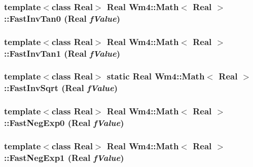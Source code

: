 \subsubsection{\setlength{\rightskip}{0pt plus 5cm}template$<$class Real$>$ Real {\bf Wm4::Math}$<$ Real $>$::Fast\-Inv\-Tan0 (Real {\em f\-Value})\hspace{0.3cm}{\tt  [static]}}\label{classWm4_1_1Math_f71b8efef9741a01ead8958f15030396}


\subsubsection{\setlength{\rightskip}{0pt plus 5cm}template$<$class Real$>$ Real {\bf Wm4::Math}$<$ Real $>$::Fast\-Inv\-Tan1 (Real {\em f\-Value})\hspace{0.3cm}{\tt  [static]}}\label{classWm4_1_1Math_6a4efcdad00d630ff4397e77dab1e74a}


\subsubsection{\setlength{\rightskip}{0pt plus 5cm}template$<$class Real$>$ static Real {\bf Wm4::Math}$<$ Real $>$::Fast\-Inv\-Sqrt (Real {\em f\-Value})\hspace{0.3cm}{\tt  [static]}}\label{classWm4_1_1Math_b8972caffea9b5925f5a4ee6026c7d51}


\subsubsection{\setlength{\rightskip}{0pt plus 5cm}template$<$class Real$>$ Real {\bf Wm4::Math}$<$ Real $>$::Fast\-Neg\-Exp0 (Real {\em f\-Value})\hspace{0.3cm}{\tt  [static]}}\label{classWm4_1_1Math_050ac5217709e69b7a60b360e7fa377a}


\subsubsection{\setlength{\rightskip}{0pt plus 5cm}template$<$class Real$>$ Real {\bf Wm4::Math}$<$ Real $>$::Fast\-Neg\-Exp1 (Real {\em f\-Value})\hspace{0.3cm}{\tt  [static]}}\label{classWm4_1_1Math_03ca49eb8afa870d5ef49c85e8fb0894}


